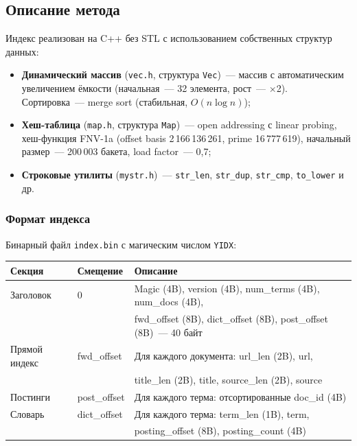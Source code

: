 \documentclass[12pt,a4paper]{article}
\begin{document}
\subsection{Описание метода}
Индекс реализован на C++ без STL с использованием собственных структур данных:

\begin{itemize}
    \item \textbf{Динамический массив} (\texttt{vec.h}, структура \texttt{Vec})~---
          массив с автоматическим увеличением ёмкости (начальная~--- 32 элемента, рост~--- $\times$2).
          Сортировка~--- merge sort (стабильная, $O(n \log n)$);
    \item \textbf{Хеш-таблица} (\texttt{map.h}, структура \texttt{Map})~---
          open addressing с linear probing, хеш-функция FNV-1a
          (offset basis 2\,166\,136\,261, prime 16\,777\,619),
          начальный размер~--- 200\,003 бакета, load factor~--- 0{,}7;
    \item \textbf{Строковые утилиты} (\texttt{mystr.h})~---
          \texttt{str\_len}, \texttt{str\_dup}, \texttt{str\_cmp}, \texttt{to\_lower} и др.
\end{itemize}

\subsubsection{Формат индекса}
Бинарный файл \texttt{index.bin} с магическим числом \texttt{YIDX}:

\begin{table}[H]
\centering
\begin{tabular}{lll}
\toprule
\textbf{Секция} & \textbf{Смещение} & \textbf{Описание} \\
\midrule
Заголовок & 0 & Magic (4B), version (4B), num\_terms (4B), num\_docs (4B), \\
          &   & fwd\_offset (8B), dict\_offset (8B), post\_offset (8B)~--- 40 байт \\
Прямой индекс & fwd\_offset & Для каждого документа: url\_len (2B), url, \\
              &            & title\_len (2B), title, source\_len (2B), source \\
Постинги & post\_offset & Для каждого терма: отсортированные doc\_id (4B) \\
Словарь & dict\_offset & Для каждого терма: term\_len (1B), term, \\
        &             & posting\_offset (8B), posting\_count (4B) \\
\bottomrule
\end{tabular}
\end{table}
\end{document}
